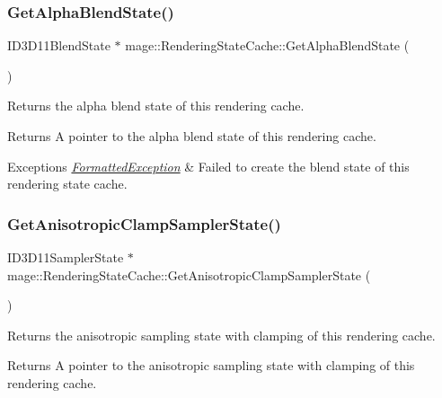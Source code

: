 \subsubsection{\texorpdfstring{Get\+Alpha\+Blend\+State()}{GetAlphaBlendState()}}
{\footnotesize\ttfamily I\+D3\+D11\+Blend\+State $\ast$ mage\+::\+Rendering\+State\+Cache\+::\+Get\+Alpha\+Blend\+State (\begin{DoxyParamCaption}{ }\end{DoxyParamCaption})}

Returns the alpha blend state of this rendering cache.

\begin{DoxyReturn}{Returns}
A pointer to the alpha blend state of this rendering cache. 
\end{DoxyReturn}

\begin{DoxyExceptions}{Exceptions}
{\em \hyperlink{structmage_1_1_formatted_exception}{Formatted\+Exception}} & Failed to create the blend state of this rendering state cache. \\
\hline
\end{DoxyExceptions}
\hypertarget{structmage_1_1_rendering_state_cache_ad4b0894beba4725e53a5a7ca3b9085cb}{}\label{structmage_1_1_rendering_state_cache_ad4b0894beba4725e53a5a7ca3b9085cb} 
\subsubsection{\texorpdfstring{Get\+Anisotropic\+Clamp\+Sampler\+State()}{GetAnisotropicClampSamplerState()}}
{\footnotesize\ttfamily I\+D3\+D11\+Sampler\+State $\ast$ mage\+::\+Rendering\+State\+Cache\+::\+Get\+Anisotropic\+Clamp\+Sampler\+State (\begin{DoxyParamCaption}{ }\end{DoxyParamCaption})}

Returns the anisotropic sampling state with clamping of this rendering cache.

\begin{DoxyReturn}{Returns}
A pointer to the anisotropic sampling state with clamping of this rendering cache. 
\end{DoxyReturn}

